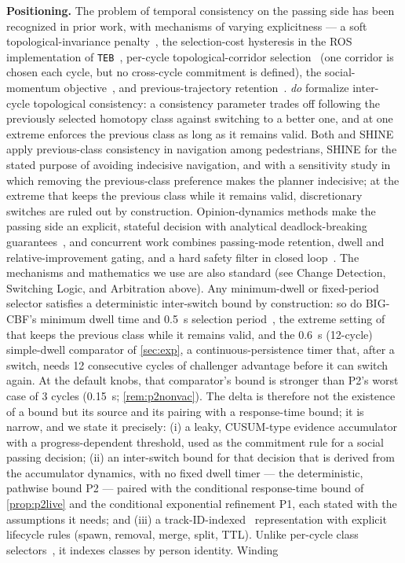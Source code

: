 \noindent\textbf{Positioning.} The problem of temporal consistency on the passing side has been recognized in prior work, with mechanisms of varying explicitness --- a soft topological-invariance penalty~\citep{mavrogiannis2023winding}, the selection-cost hysteresis in the ROS implementation of \texttt{TEB}~\citep{rosmann2017teb}, per-cycle topological-corridor selection~\citep{cao2019dynamicchannel} (one corridor is chosen each cycle, but no cross-cycle commitment is defined), the social-momentum objective~\citep{mavrogiannis2022momentum}, and previous-trajectory retention~\citep{zhou2023minimally}. \citet{degroot2024topology} \emph{do} formalize inter-cycle topological consistency: a consistency parameter trades off following the previously selected homotopy class against switching to a better one, and at one extreme enforces the previous class as long as it remains valid. Both \citet{degroot2024topology} and SHINE~\citep{martinezbaselga2026shine} apply previous-class consistency in navigation among pedestrians, SHINE for the stated purpose of avoiding indecisive navigation, and \citet{degroot2024topology} with a sensitivity study in which removing the previous-class preference makes the planner indecisive; at the extreme that keeps the previous class while it remains valid, discretionary switches are ruled out by construction. Opinion-dynamics methods make the passing side an explicit, stateful decision with analytical deadlock-breaking guarantees~\citep{cathcart2023opinion}, and concurrent work combines passing-mode retention, dwell and relative-improvement gating, and a hard safety filter in closed loop~\citep{li2026bigcbf}. The mechanisms and mathematics we use are also standard (see Change Detection, Switching Logic, and Arbitration above). Any minimum-dwell or fixed-period selector satisfies a deterministic inter-switch bound by construction: so do BIG-CBF's minimum dwell time and 0.5~s selection period~\citep{li2026bigcbf}, the extreme setting of \citet{degroot2024topology} that keeps the previous class while it remains valid, and the 0.6~s (12-cycle) simple-dwell comparator of \cref{sec:exp}, a continuous-persistence timer that, after a switch, needs 12 consecutive cycles of challenger advantage before it can switch again. At the default knobs, that comparator's bound is stronger than P2's worst case of 3 cycles (0.15~s; \cref{rem:p2nonvac}). The delta is therefore not the existence of a bound but its source and its pairing with a response-time bound; it is narrow, and we state it precisely: (i) a leaky, CUSUM-type evidence accumulator with a progress-dependent threshold, used as the commitment rule for a social passing decision; (ii) an inter-switch bound for that decision that is derived from the accumulator dynamics, with no fixed dwell timer --- the deterministic, pathwise bound P2 --- paired with the conditional response-time bound of \cref{prop:p2live} and the conditional exponential refinement P1, each stated with the assumptions it needs; and (iii) a track-ID-indexed \Class\ representation with explicit lifecycle rules (spawn, removal, merge, split, TTL). Unlike per-cycle class selectors~\citep{rosmann2017teb,cao2019dynamicchannel,degroot2024topology,martinezbaselga2026shine}, it indexes classes by person identity. Winding 